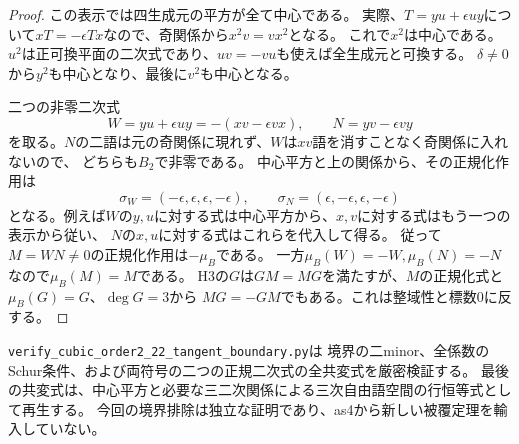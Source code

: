 \begin{proof}
この表示では四生成元の平方が全て中心である。
実際、$T=yu+\epsilon uy$について$xT=-\epsilon Tx$なので、奇関係から$x^2v=vx^2$となる。
これで$x^2$は中心である。
$u^2$は正可換平面の二次式であり、$uv=-vu$も使えば全生成元と可換する。
$\delta\ne0$から$y^2$も中心となり、最後に$v^2$も中心となる。

二つの非零二次式
\[
 W=yu+\epsilon uy=-(xv-\epsilon vx),\qquad N=yv-\epsilon vy
\]
を取る。$N$の二語は元の奇関係に現れず、$W$は$xv$語を消すことなく奇関係に入れないので、
どちらも$B_2$で非零である。
中心平方と上の関係から、その正規化作用は
\[
 \sigma_W=(-\epsilon,\epsilon,\epsilon,-\epsilon),\qquad
 \sigma_N=(\epsilon,-\epsilon,\epsilon,-\epsilon)
\]
となる。例えば$W$の$y,u$に対する式は中心平方から、$x,v$に対する式はもう一つの表示から従い、
$N$の$x,u$に対する式はこれらを代入して得る。
従って$M=WN\ne0$の正規化作用は$-\mu_B$である。
一方$\mu_B(W)=-W,\mu_B(N)=-N$なので$\mu_B(M)=M$である。
H3の$G$は$GM=MG$を満たすが、$M$の正規化式と$\mu_B(G)=G$、$\deg G=3$から
$MG=-GM$でもある。これは整域性と標数0に反する。
\end{proof}

\texttt{verify\_cubic\_order2\_22\_tangent\_boundary.py}は
境界の二minor、全係数のSchur条件、および両符号の二つの正規二次式の全共変式を厳密検証する。
最後の共変式は、中心平方と必要な三二次関係による三次自由語空間の行恒等式として再生する。
今回の境界排除は独立な証明であり、as4から新しい被覆定理を輸入していない。
